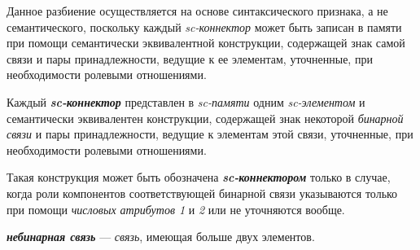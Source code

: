 \begin{SCn}
\begin{SCn}
\begin{scnsubdividing}
\end{scnsubdividing}
	
\begin{scnsubdividing}
\end{scnsubdividing}
\end{SCn}

Данное разбиение осуществляется на основе синтаксического признака, а не семантического, поскольку каждый \textit{sc-коннектор} может быть записан в памяти при помощи семантически эквивалентной конструкции, содержащей знак самой связи и пары принадлежности, ведущие к ее элементам, уточненные, при необходимости ролевыми отношениями.

Каждый \textbf{\textit{sc-коннектор}} представлен в \textit{sc-памяти} одним \textit{sc-элементом} и семантически эквивалентен конструкции, содержащей знак некоторой \textit{бинарной связи} и пары принадлежности, ведущие к элементам этой связи, уточненные, при необходимости ролевыми отношениями.

Такая конструкция может быть обозначена \textbf{\textit{sc-коннектором}} только в случае, когда роли компонентов соответствующей бинарной связи указываются только при помощи \textit{числовых атрибутов 1\scnrolesign} и \textit{2\scnrolesign} или не уточняются вообще.
	
\textbf{\textit{небинарная связь}} --- \textit{связь}, имеющая больше двух элементов.

\begin{SCn}
	
	
	
\end{SCn}
	

\end{SCn}
